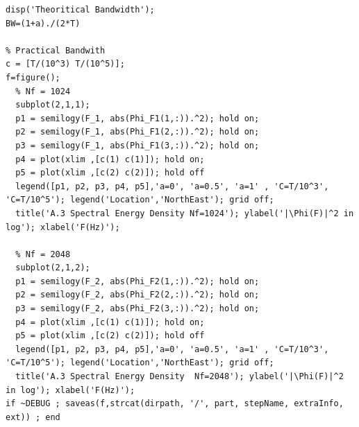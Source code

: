 \documentclass[11pt]{article}
\begin{document}
\begin{lstlisting}[caption = {\texttt{part\_a.m}}]
% Theoritical Bandwidth
disp('Theoritical Bandwidth');
BW=(1+a)./(2*T)

% Practical Bandwith 
c = [T/(10^3) T/(10^5)];
f=figure();
  % Nf = 1024
  subplot(2,1,1); 
  p1 = semilogy(F_1, abs(Phi_F1(1,:)).^2); hold on;
  p2 = semilogy(F_1, abs(Phi_F1(2,:)).^2); hold on;
  p3 = semilogy(F_1, abs(Phi_F1(3,:)).^2); hold on;
  p4 = plot(xlim ,[c(1) c(1)]); hold on;
  p5 = plot(xlim ,[c(2) c(2)]); hold off
  legend([p1, p2, p3, p4, p5],'a=0', 'a=0.5', 'a=1' , 'C=T/10^3', 'C=T/10^5'); legend('Location','NorthEast'); grid off;
  title('A.3 Spectral Energy Density Nf=1024'); ylabel('|\Phi(F)|^2 in log'); xlabel('F(Hz)');

  % Nf = 2048
  subplot(2,1,2); 
  p1 = semilogy(F_2, abs(Phi_F2(1,:)).^2); hold on;
  p2 = semilogy(F_2, abs(Phi_F2(2,:)).^2); hold on;
  p3 = semilogy(F_2, abs(Phi_F2(3,:)).^2); hold on;
  p4 = plot(xlim ,[c(1) c(1)]); hold on;
  p5 = plot(xlim ,[c(2) c(2)]); hold off
  legend([p1, p2, p3, p4, p5],'a=0', 'a=0.5', 'a=1' , 'C=T/10^3', 'C=T/10^5'); legend('Location','NorthEast'); grid off;
  title('A.3 Spectral Energy Density  Nf=2048'); ylabel('|\Phi(F)|^2 in log'); xlabel('F(Hz)');
if ~DEBUG ; saveas(f,strcat(dirpath, '/', part, stepName, extraInfo, ext)) ; end
\end{lstlisting}
   
   
   
\end{document}
